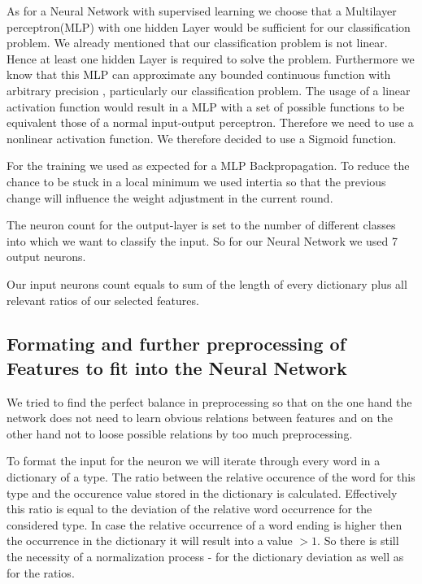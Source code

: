 \documentclass[paper=A4,pagesize=auto,12pt,headinclude=true,footinclude=true,BCOR=0mm,DIV=calc]{scrartcl}
\begin{document}
As for a Neural Network with supervised learning we choose that a Multilayer perceptron(MLP) with one hidden Layer would be sufficient for our classification problem. We already mentioned that our classification problem is not linear. Hence at least one hidden Layer is required to solve the problem. Furthermore we know that this MLP can approximate any bounded continuous function with arbitrary precision \cite{ApproximateAnyFunction}, particularly our classification problem.
The usage of a linear activation function would result in a MLP with a set of possible functions to be equivalent those of a normal input-output perceptron. Therefore we need to use a nonlinear activation function. We therefore decided to use a Sigmoid function. 

For the training we used as expected for a MLP Backpropagation. To reduce the chance to be stuck in a local minimum we used intertia so that the previous change will influence the weight adjustment in the current round.

The neuron count for the output-layer is set to the number of different classes into which we want to classify the input. So for our Neural Network we used 7 output neurons.

Our input neurons count equals to sum of the length of every dictionary plus all relevant ratios of our selected features.

\subsection{Formating and further preprocessing of Features to fit into the Neural Network}
We tried to find the perfect balance in preprocessing so that on the one hand the network does not need to learn obvious relations between features and on the other hand not to loose possible relations by too much preprocessing.

To format the input for the neuron we will iterate through every word in a dictionary of a type. The ratio between the relative occurence of the word for this type and the occurence value stored in the dictionary is calculated. Effectively this ratio is equal to the deviation of the relative word occurrence for the considered type. In case the relative occurrence of a word ending is higher then the occurrence in the dictionary it will result into a value $> 1$. So there is still the necessity of a normalization process - for the dictionary deviation as well as for the ratios.
\end{document}
